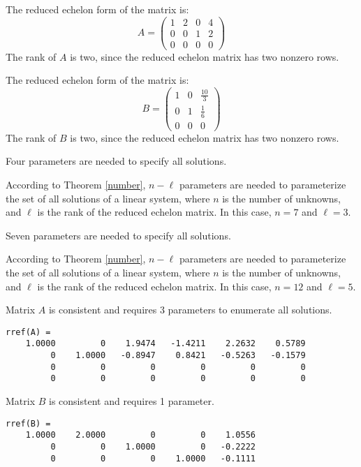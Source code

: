 \documentclass{ximera}
\begin{document}
The reduced echelon form of the matrix is:
\[
A = \left(\begin{array}{rrrr} 1 & 2 & 0 & 4 \\ 0 & 0 & 1 & 2 \\ 0 & 0 & 0
& 0\end{array}\right)
\]
The rank of $A$ is two, since the reduced echelon matrix has two nonzero
rows.

The reduced echelon form of the matrix is:
\[
B=\left(\begin{array}{rrr} 1 & 0 & \frac{10}{3} \\ 
0 & 1 & \frac{1}{6} \\ 0 & 0 & 0 \end{array}\right)
\]
The rank of $B$ is two, since the reduced echelon matrix has two nonzero
rows.

\ans Four parameters are needed to specify all solutions.

\soln According to Theorem \ref{number}, $n - \ell$
parameters are needed to parameterize the set of all solutions of a
linear system, where $n$ is the number of unknowns, and $\ell$ is the
rank of the reduced echelon matrix.  In this case, $n = 7$ and $\ell =
3$.

\ans Seven parameters are needed to specify all solutions.

\soln According to Theorem \ref{number}, $n - \ell$
parameters are needed to parameterize the set of all solutions of a
linear system, where $n$ is the number of unknowns, and $\ell$ is the
rank of the reduced echelon matrix.  In this case, $n = 12$ and $\ell =
5$.


\ans Matrix $A$ is consistent and requires 3 parameters to enumerate
all solutions.

\soln
\begin{verbatim}
rref(A) = 
    1.0000         0    1.9474   -1.4211    2.2632    0.5789
         0    1.0000   -0.8947    0.8421   -0.5263   -0.1579
         0         0         0         0         0         0
         0         0         0         0         0         0
\end{verbatim}

\ans Matrix $B$ is consistent and requires 1 parameter.

\soln
\begin{verbatim}
rref(B) =
    1.0000    2.0000         0         0    1.0556
         0         0    1.0000         0   -0.2222
         0         0         0    1.0000   -0.1111
\end{verbatim}
\end{document}
